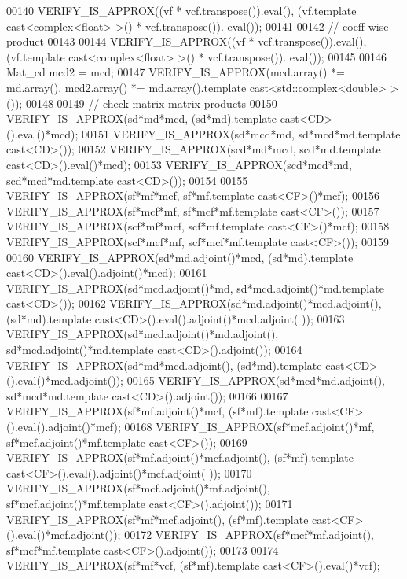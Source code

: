\begin{DoxyCode}
00140   VERIFY\_IS\_APPROX((vf * vcf.transpose()).eval(), (vf.template cast<complex<float> >() * vcf.transpose()).
      eval());
00141 
00142   \textcolor{comment}{// coeff wise product}
00143 
00144   VERIFY\_IS\_APPROX((vf * vcf.transpose()).eval(), (vf.template cast<complex<float> >() * vcf.transpose()).
      eval());
00145 
00146   Mat\_cd mcd2 = mcd;
00147   VERIFY\_IS\_APPROX(mcd.array() *= md.array(), mcd2.array() *= md.array().template cast<std::complex<double>
       >());
00148   
00149   \textcolor{comment}{// check matrix-matrix products}
00150   VERIFY\_IS\_APPROX(sd*md*mcd, (sd*md).\textcolor{keyword}{template} cast<CD>().eval()*mcd);
00151   VERIFY\_IS\_APPROX(sd*mcd*md, sd*mcd*md.template cast<CD>());
00152   VERIFY\_IS\_APPROX(scd*md*mcd, scd*md.template cast<CD>().eval()*mcd);
00153   VERIFY\_IS\_APPROX(scd*mcd*md, scd*mcd*md.template cast<CD>());
00154 
00155   VERIFY\_IS\_APPROX(sf*mf*mcf, sf*mf.template cast<CF>()*mcf);
00156   VERIFY\_IS\_APPROX(sf*mcf*mf, sf*mcf*mf.template cast<CF>());
00157   VERIFY\_IS\_APPROX(scf*mf*mcf, scf*mf.template cast<CF>()*mcf);
00158   VERIFY\_IS\_APPROX(scf*mcf*mf, scf*mcf*mf.template cast<CF>());
00159 
00160   VERIFY\_IS\_APPROX(sd*md.adjoint()*mcd, (sd*md).\textcolor{keyword}{template} cast<CD>().eval().adjoint()*mcd);
00161   VERIFY\_IS\_APPROX(sd*mcd.adjoint()*md, sd*mcd.adjoint()*md.template cast<CD>());
00162   VERIFY\_IS\_APPROX(sd*md.adjoint()*mcd.adjoint(), (sd*md).\textcolor{keyword}{template} cast<CD>().eval().adjoint()*mcd.adjoint(
      ));
00163   VERIFY\_IS\_APPROX(sd*mcd.adjoint()*md.adjoint(), sd*mcd.adjoint()*md.template cast<CD>().adjoint());
00164   VERIFY\_IS\_APPROX(sd*md*mcd.adjoint(), (sd*md).\textcolor{keyword}{template} cast<CD>().eval()*mcd.adjoint());
00165   VERIFY\_IS\_APPROX(sd*mcd*md.adjoint(), sd*mcd*md.template cast<CD>().adjoint());
00166 
00167   VERIFY\_IS\_APPROX(sf*mf.adjoint()*mcf, (sf*mf).\textcolor{keyword}{template} cast<CF>().eval().adjoint()*mcf);
00168   VERIFY\_IS\_APPROX(sf*mcf.adjoint()*mf, sf*mcf.adjoint()*mf.template cast<CF>());
00169   VERIFY\_IS\_APPROX(sf*mf.adjoint()*mcf.adjoint(), (sf*mf).\textcolor{keyword}{template} cast<CF>().eval().adjoint()*mcf.adjoint(
      ));
00170   VERIFY\_IS\_APPROX(sf*mcf.adjoint()*mf.adjoint(), sf*mcf.adjoint()*mf.template cast<CF>().adjoint());
00171   VERIFY\_IS\_APPROX(sf*mf*mcf.adjoint(), (sf*mf).\textcolor{keyword}{template} cast<CF>().eval()*mcf.adjoint());
00172   VERIFY\_IS\_APPROX(sf*mcf*mf.adjoint(), sf*mcf*mf.template cast<CF>().adjoint());
00173 
00174   VERIFY\_IS\_APPROX(sf*mf*vcf, (sf*mf).\textcolor{keyword}{template} cast<CF>().eval()*vcf);

\end{DoxyCode}
